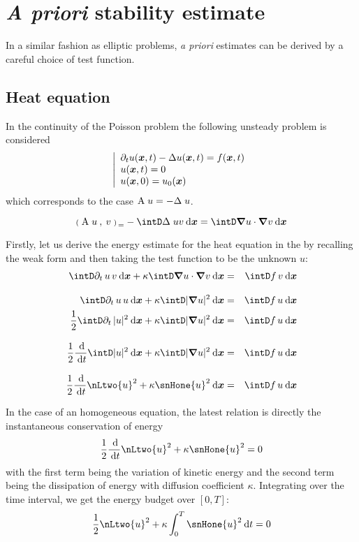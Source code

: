 \section{\textit{A priori} stability estimate}

In a similar fashion as elliptic problems, \textit{a priori} estimates can be derived by a careful choice of test function.

\subsection{Heat equation}

In the continuity of the Poisson problem the following unsteady problem is considered
\begin{equation*}
\left\lvert
\begin{array}{l}
\partial_t u({{\boldsymbol x}},t) - \Delta u({{\boldsymbol x}},t) = f({{\boldsymbol x}},t) \\
u({{\boldsymbol x}},t) = 0 \\
u({{\boldsymbol x}},0) = u_0({{\boldsymbol x}})
\end{array}
\right.
\end{equation*}
which corresponds to the case ${\mathrm A}\;u = - \Delta\;u$.

\begin{equation*}
\InnerP{\matA\;u}{v} = - \intD \Delta\;u v \dxx = \intD \Grad u \cdot \Grad v \dxx
\end{equation*}

Firstly, let us derive the energy estimate for the heat equation in the by recalling the weak form and then taking the test function to be the unknown $u$:
\begin{eqnarray*}
\intD \pdt u\, v \dxx + \kappa \intD \Grad u \cdot \Grad v \dxx &=& \intD f\,v \dxx \\[2ex]
\intD \pdt u\, u \dxx + \kappa \intD | \Grad u |^2 \dxx &=& \intD f\,u \dxx \\
\dfrac{1}{2}\intD \pdt |u|^2 \dxx + \kappa \intD | \Grad u |^2 \dxx &=& \intD f\,u \dxx \\[2ex]
\dfrac{1}{2} \ddd{t} \intD  |u|^2 \dxx + \kappa \intD | \Grad u |^2 \dxx &=& \intD f\,u \dxx \\[2ex]
\dfrac{1}{2} \ddd{t} \nLtwo{u}^2 + \kappa \snHone{u}^2 \dxx &=& \intD f\,u \dxx
\end{eqnarray*}

In the case of an homogeneous equation, the latest relation is directly the instantaneous conservation of energy
\begin{equation}
\dfrac{1}{2} \ddd{t} \nLtwo{u}^2 + \kappa \snHone{u}^2 = 0
\end{equation}
with the first term being the variation of kinetic energy and the second term being the dissipation of energy with diffusion coefficient $\kappa$.
Integrating over the time interval, we get the energy budget over $[0,T]$:
\begin{equation}\label{eq:energy_budget}
\dfrac{1}{2} \nLtwo{u}^2 + \kappa \int_{0}^T \snHone{u}^2 \dt = 0
\end{equation}

